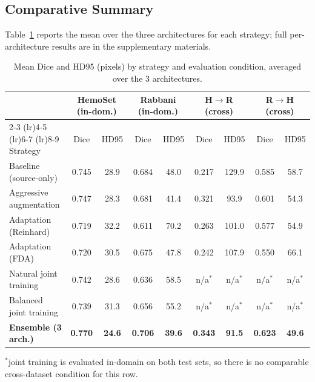\documentclass[10pt,conference]{IEEEtran}
\begin{document}
\subsection{Comparative Summary}

Table~\ref{tab:summary} reports the mean over the three architectures for each strategy; full per-architecture results are in the supplementary materials.

\begin{table}[t]
\centering
\caption{Mean Dice and HD95 (pixels) by strategy and evaluation condition, averaged over the 3 architectures.}
\label{tab:summary}
\small
\begin{tabular}{lcccccccc}
\toprule
& \multicolumn{2}{c}{HemoSet (in-dom.)} & \multicolumn{2}{c}{Rabbani (in-dom.)} & \multicolumn{2}{c}{H$\rightarrow$R (cross)} & \multicolumn{2}{c}{R$\rightarrow$H (cross)} \\
\cmidrule(lr){2-3} \cmidrule(lr){4-5} \cmidrule(lr){6-7} \cmidrule(lr){8-9}
Strategy & Dice & HD95 & Dice & HD95 & Dice & HD95 & Dice & HD95 \\
\midrule
Baseline (source-only)       & 0.745 & 28.9 & 0.684 & 48.0 & 0.217 & 129.9 & 0.585 & 58.7 \\
Aggressive augmentation      & 0.747 & 28.3 & 0.681 & 41.4 & 0.321 & 93.9  & 0.601 & 54.3 \\
Adaptation (Reinhard)        & 0.719 & 32.2 & 0.611 & 70.2 & 0.263 & 101.0 & 0.577 & 54.9 \\
Adaptation (FDA)             & 0.720 & 30.5 & 0.675 & 47.8 & 0.242 & 107.9 & 0.550 & 66.1 \\
Natural joint training       & 0.742 & 28.6 & 0.636 & 58.5 & n/a$^*$ & n/a$^*$ & n/a$^*$ & n/a$^*$ \\
Balanced joint training      & 0.739 & 31.3 & 0.656 & 55.2 & n/a$^*$ & n/a$^*$ & n/a$^*$ & n/a$^*$ \\
\textbf{Ensemble (3 arch.)}  & \textbf{0.770} & \textbf{24.6} & \textbf{0.706} & \textbf{39.6} & \textbf{0.343} & \textbf{91.5} & \textbf{0.623} & \textbf{49.6} \\
\bottomrule
\end{tabular}
\vspace{2pt}

\footnotesize{$^*$joint training is evaluated in-domain on both test sets, so there is no comparable cross-dataset condition for this row.}
\end{table}
\end{document}
